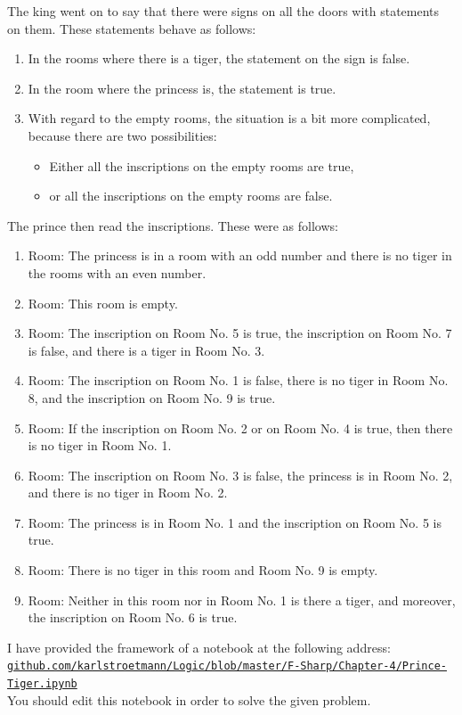 The king went on to say that there were signs on all the doors with statements on them. These statements behave as follows:
\begin{enumerate}
\item In the rooms where there is a tiger, the statement on the sign is false.
\item In the room where the princess is, the statement is true.
\item With regard to the empty rooms, the situation is a bit more
      complicated, because there are two possibilities:
      \begin{itemize}
      \item Either all the inscriptions on the empty rooms are true,
      \item or all the inscriptions on the empty rooms are false.
      \end{itemize}

\end{enumerate}
The prince then read the inscriptions. These were as follows:
\begin{enumerate}
\item Room: The princess is in a room with an odd number and
      there is no tiger in the rooms with an even number.
\item Room: This room is empty.
\item Room: The inscription on Room No. 5 is true, the inscription on Room No. 7 is false,
      and there is a tiger in Room No. 3.
\item Room: The inscription on Room No. 1 is false, there is no tiger in Room No. 8,
      and the inscription on Room No. 9 is true.
\item Room: If the inscription on Room No. 2 or on Room No. 4 is true,
      then there is no tiger in Room No. 1.
\item Room: The inscription on Room No. 3 is false, the princess is in Room No. 2,
      and there is no tiger in Room No. 2.
\item Room: The princess is in Room No. 1 and the inscription on Room No. 5 is true.
\item Room: There is no tiger in this room and Room No. 9 is empty.
\item Room: Neither in this room nor in Room No. 1 is there a tiger, and moreover, the
      inscription on Room No. 6 is true.
\end{enumerate} 
I have provided the framework of a notebook at the following address:
\\[0.2cm]
\href{https://github.com/karlstroetmann/Logic/blob/master/F-Sharp/Chapter-4/Prince-Tiger.ipynb}{\small\texttt{github.com/karlstroetmann/Logic/blob/master/F-Sharp/Chapter-4/Prince-Tiger.ipynb}}
\\[0.2cm]
You should edit this notebook in order to solve the given problem. \eox
\vspace*{1cm}

